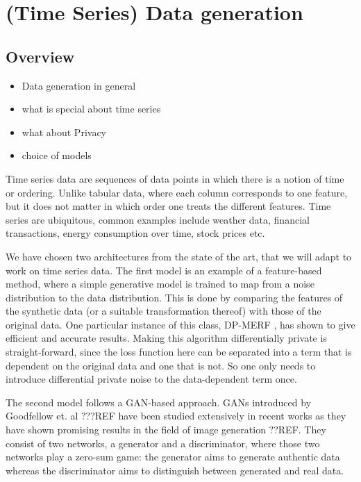 \section[(Time Series) Data generation]{(Time Series) Data generation}\label{chapter3}
\subsection{Overview}
    \begin{itemize}
        \item Data generation in general
        \item what is special about time series
        \item what about Privacy
        \item choice of models
    \end{itemize}

Time series data are sequences of data points in which there is a notion of time or ordering. Unlike tabular data, where each column corresponds to one feature, but it does not matter in which order one treats the different features. Time series are ubiquitous, common examples include weather data, financial transactions, energy consumption over time, stock prices etc.

We have chosen two architectures from the state of the art, that we will adapt to work on time series data. The first model is an example of a feature-based method, where a simple generative model is trained to map from a noise distribution to the data distribution. This is done by comparing the features of the synthetic data (or a suitable transformation thereof) with those of the original data. One particular instance of this class, DP-MERF \parencite{dpmerf}, has shown to give efficient and accurate results. Making this algorithm differentially private is straight-forward, since the loss function here can be separated into a term that is dependent on the original data and one that is not. So one only needs to introduce differential private noise to the data-dependent term once.


The second model follows a GAN-based approach. GANs introduced by Goodfellow et. al ???REF have been studied extensively in recent works as they have shown promising results in the field of image generation ??REF. They consist of two networks, a generator and a discriminator, where those two networks play a zero-sum game: the generator aims to generate authentic data whereas the discriminator aims to distinguish between generated and real data.


